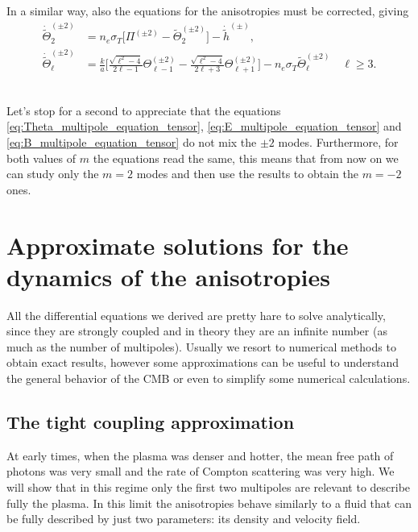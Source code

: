In a similar way, also the equations for the anisotropies must be corrected, giving
\begin{subequations}\label{eq:Theta_multipole_equation_tensor}
    \begin{align}\label{eq:Theta_multipole_equation_tensor_l=2}
    \dot{\tilde\Theta}_2^{(\pm2)}&=n_e\sigma_T\bigg[\Pi^{(\pm2)}-\tilde\Theta_{2}^{(\pm2)}\bigg]-\dot{\tilde h}^{(\pm)},\\\label{eq:Theta_multipole_equation_tensor_l>2}
    \dot{\tilde\Theta}_\ell^{(\pm2)}&=\frac{k}{a}\bigg[\frac{\sqrt{\ell^2-4}}{2\ell-1}\Theta_{\ell-1}^{(\pm2)}-\frac{\sqrt{\ell^2-4}}{2\ell+3}\Theta_{\ell+1}^{(\pm2)}\bigg]-n_e\sigma_T\tilde\Theta_{\ell}^{(\pm2)}\quad \ell\geq3.
\end{align}
\end{subequations}
\

Let's stop for a second to appreciate that the equations \eqref{eq:Theta_multipole_equation_tensor}, \eqref{eq:E_multipole_equation_tensor} and \eqref{eq:B_multipole_equation_tensor} do not mix the $\pm2$ modes. Furthermore, for both values of $m$ the equations read the same, this means that from now on we can study only the $m=2$ modes and then use the results to obtain the $m=-2$ ones.
\section{Approximate solutions for the dynamics of the anisotropies}\label{sec:CMBApproximations}
All the differential equations we derived are pretty hare to solve analytically, since they are strongly coupled and in theory they are an infinite number (as much as the number of multipoles). Usually we resort to numerical methods to obtain exact results, however some approximations can be useful to understand the general behavior of the CMB or even to simplify some numerical calculations.
\subsection{The tight coupling approximation}
\label{sec:TightCouplingApproximation}
At early times, when the plasma was denser and hotter, the mean free path of photons was very small and the rate of Compton scattering was very high. We will show that in this regime only the first two multipoles are  relevant to describe fully the plasma. In this limit the anisotropies behave similarly to a fluid that can be fully described by just two parameters: its density and velocity field.

